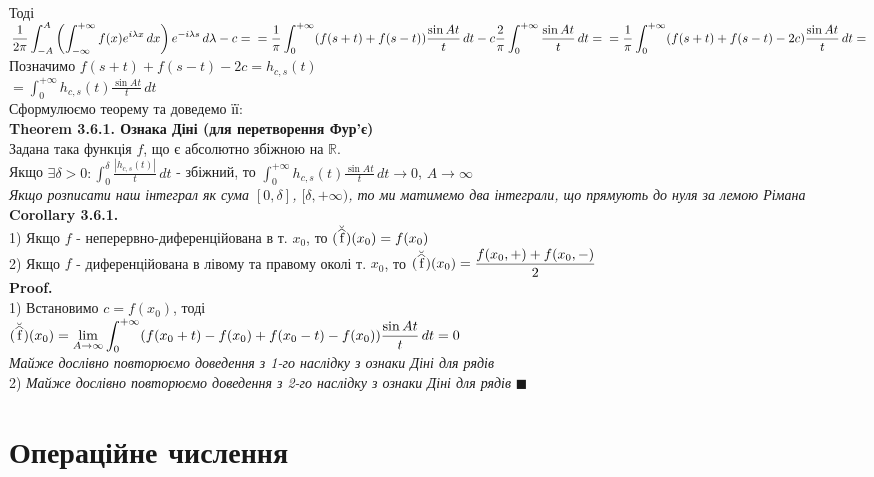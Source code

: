 \documentclass[a4paper, 10pt]{article}
\newcommand\reallywidehat[1]{%
\savestack{\tmpbox}{\stretchto{%
  \scaleto{%
    \scalerel*[\widthof{\ensuremath{#1}}]{\kern-.6pt\bigwedge\kern-.6pt}%
    {\rule[-\textheight/2]{1ex}{\textheight}}%
  }{\textheight}%
}{0.5ex}}%
\stackon[1pt]{#1}{\tmpbox}%
}
\def\hugespace{\vspace{5mm} \\}
\theoremstyle{theoremdd}
\theoremstyle{theoremdd}
\theoremstyle{theoremdd}
\theoremstyle{theoremdd}
\theoremstyle{theoremdd}
\theoremstyle{theoremdd}
\theoremstyle{theoremdd}
\theoremstyle{theoremdd}
\begin{document}
\\
Тоді\\
$\displaystyle \frac{1}{2\pi} \displaystyle \int_{-A}^{A} \left(\int_{-\infty}^{+\infty} f(x) e^{i\lambda x}\,dx \right) e^{-i \lambda s}\,d\lambda - c = \\ 
= \frac{1}{\pi} \int_{0}^{+\infty} (f(s+t)+f(s-t)) \frac{ \sin At}{t} \,dt - c \frac{2}{\pi} \int_0^{+\infty} \frac{\sin At}{t}\,dt = \\ 
= \frac{1}{\pi} \int_{0}^{+\infty} (f(s+t)+f(s-t)-2c) \frac{\sin At}{t}\,dt =$\\
Позначимо $f(s+t)+f(s-t)-2c=h_{c,s}(t)$\\
$= \displaystyle \int_{0}^{+\infty} h_{c,s}(t) \frac{\sin At}{t}\,dt$\\
Сформулюємо теорему та доведемо її:
\hugespace
\textbf{Theorem 3.6.1. Ознака Діні (для перетворення Фур'є)}\\
Задана така функція $f$, що є абсолютно збіжною на $\mathbb{R}$.\\
Якщо $\exists \delta>0: \displaystyle \int_{0}^{\delta} \frac{|h_{c,s}(t)|}{t}\,dt$ - збіжний, то $\displaystyle \int_{0}^{+\infty} h_{c,s}(t) \frac{\sin At}{t}\,dt \to 0$, $A \to \infty$\\
\textit{Якщо розписати наш інтеграл як сума $[0,\delta]$, $[\delta, +\infty)$, то ми матимемо два інтеграли, що прямують до нуля за лемою Рімана}
\hugespace
\textbf{Corollary 3.6.1.}\\
1) Якщо $f$ - неперервно-диференційована в т. $x_0$, то $\breve{(\reallywidehat{f})}(x_0) = f(x_0)$
\hugespace
2) Якщо $f$ - диференційована в лівому та правому околі т. $x_0$, то $\displaystyle \breve{(\reallywidehat{f})}(x_0) = \frac{f(x_0,+)+f(x_0,-)}{2}$\\
\textbf{Proof.}\\
1) Встановимо $c = f(x_0)$, тоді\\
$\displaystyle \breve{(\reallywidehat{f})}(x_0) = \lim_{A \to \infty} \int_{0}^{+\infty} (f(x_0+t)-f(x_0)+f(x_0-t)-f(x_0)) \frac{\sin At}{t}\,dt = 0$\\
\textit{Майже дослівно повторюємо доведення з 1-го наслідку з ознаки Діні для рядів}
\hugespace
2) \textit{Майже дослівно повторюємо доведення з 2-го наслідку з ознаки Діні для рядів} $\blacksquare$
\\
\newpage




\section{Операційне числення}
\end{document}
